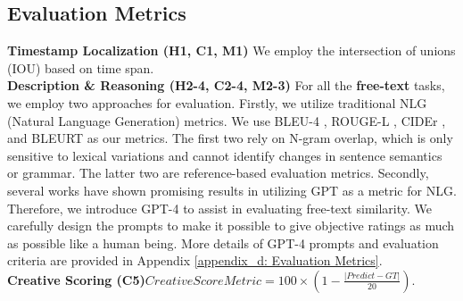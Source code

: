 \subsection{Evaluation Metrics}
\noindent\textbf{Timestamp Localization (H1, C1, M1)}\quad 
We employ the intersection of unions (IOU) based on time span. \\
\noindent\textbf{Description \& Reasoning (H2-4, C2-4, M2-3)}\quad
For all the \textbf{free-text} tasks, we employ two approaches for evaluation. Firstly, we utilize traditional NLG (Natural Language Generation) metrics. We use BLEU-4 \cite{papineni2002bleu}, ROUGE-L \cite{lin2004rouge}, CIDEr \cite{vedantam2015cider}, and BLEURT \cite{pu2021learning} as our metrics. The first two rely on N-gram overlap, which is only sensitive to lexical variations and cannot identify changes in sentence semantics or grammar. The latter two are reference-based evaluation metrics. Secondly, several works \cite{wang2023chatgpt, fu2023gptscore, kamalloo2023evaluating, chiang2023can} have shown promising results in utilizing GPT as a metric for NLG. Therefore, we introduce GPT-4 to assist in evaluating free-text similarity. We carefully design the prompts to make it possible to give objective ratings as much as possible like a human being. More details of GPT-4 prompts and evaluation criteria are provided in Appendix 
\ref{appendix_d: Evaluation Metrics}.\\
\noindent\textbf{Creative Scoring (C5)}\quad $Creative Score Metric = 100 \times \left(1 - \frac{{\lvert Predict - GT \rvert}}{{20}}\right)$.
